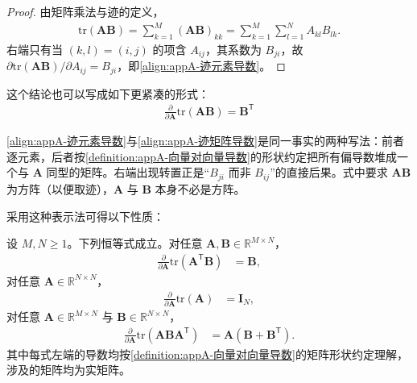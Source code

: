 \documentclass[../main.tex]{subfiles}
\begin{document}
\begin{proof}
由矩阵乘法与迹的定义，
\begin{align*}
 \mathrm{tr}(\bm{A}\bm{B})=\sum_{k=1}^{M}(\bm{A}\bm{B})_{kk}=\sum_{k=1}^{M}\sum_{l=1}^{N}A_{kl}B_{lk}.
\end{align*}
右端只有当 $(k,l)=(i,j)$ 的项含 $A_{ij}$，其系数为 $B_{ji}$，故 $\partial\mathrm{tr}(\bm{A}\bm{B})/\partial A_{ij}=B_{ji}$，即\eqref{align:appA-迹元素导数}。
\end{proof}

这个结论也可以写成如下更紧凑的形式：
\begin{align}
  \frac{\partial}{\partial\bm{A}}\mathrm{tr}(\bm{A}\bm{B})=\bm{B}^{\mathsf{T}}
  \label{align:appA-迹矩阵导数}
\end{align}

\begin{remark}
\eqref{align:appA-迹元素导数}与\eqref{align:appA-迹矩阵导数}是同一事实的两种写法：前者逐元素，后者按\cref{definition:appA-向量对向量导数}的形状约定把所有偏导数堆成一个与 $\bm{A}$ 同型的矩阵。右端出现转置正是“$B_{ji}$ 而非 $B_{ij}$”的直接后果。式中要求 $\bm{A}\bm{B}$ 为方阵（以便取迹），$\bm{A}$ 与 $\bm{B}$ 本身不必是方阵。
\end{remark}

采用这种表示法可得以下性质：
\begin{proposition}[矩阵导数的若干恒等式]\label{proposition:appA-矩阵导数恒等式}
设 $M,N\geqslant1$。下列恒等式成立。对任意 $\bm{A},\bm{B}\in\mathbb{R}^{M\times N}$，
\begin{align}
  \frac{\partial}{\partial\bm{A}}\mathrm{tr}(\bm{A}^{\mathsf{T}}\bm{B})&=\bm{B},
  \label{align:appA-矩阵导数性质1}
\end{align}
对任意 $\bm{A}\in\mathbb{R}^{N\times N}$，
\begin{align}
  \frac{\partial}{\partial\bm{A}}\mathrm{tr}(\bm{A})&=\bm{I}_{N},
  \label{align:appA-矩阵导数性质2}
\end{align}
对任意 $\bm{A}\in\mathbb{R}^{M\times N}$ 与 $\bm{B}\in\mathbb{R}^{N\times N}$，
\begin{align}
  \frac{\partial}{\partial\bm{A}}\mathrm{tr}(\bm{A}\bm{B}\bm{A}^{\mathsf{T}})&=\bm{A}(\bm{B}+\bm{B}^{\mathsf{T}}).
  \label{align:appA-矩阵导数性质3}
\end{align}
其中每式左端的导数均按\cref{definition:appA-向量对向量导数}的矩阵形状约定理解，涉及的矩阵均为实矩阵。
\end{proposition}
\end{document}
